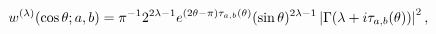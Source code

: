 \[w^{(\lambda)}(\mathop{\cos\/}\nolimits\theta;a,b)=\pi^{-1}\*2^{2\lambda-1}\*e^%
{(2\theta-\pi)\*\tau_{a,b}(\theta)}\*(\mathop{\sin\/}\nolimits\theta)^{2%
\lambda-1}\*\left|\mathop{\Gamma\/}\nolimits\!\left(\lambda+i\tau_{a,b}(\theta%
)\right)\right|^{2},\]